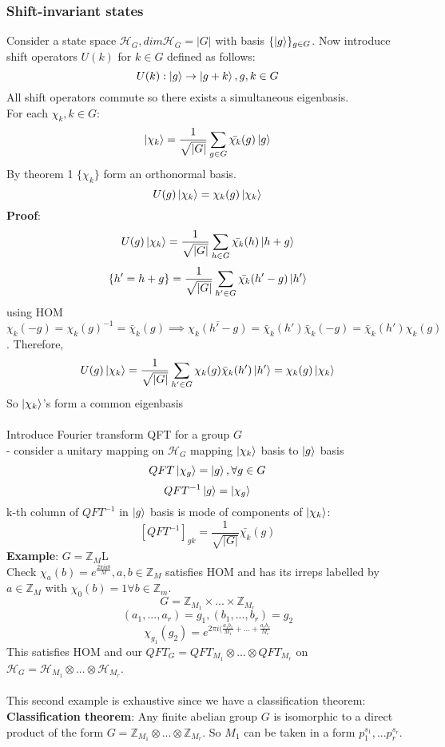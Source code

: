\documentclass{article}
\begin{document}
\subsubsection{Shift-invariant states}
Consider a state space $\mathcal{H}_G, dim \mathcal{H}_G = |G|$ with basis $\{ \ket{g}\}_{g \in G}$. Now introduce shift operators $U(k)$ for $k \in G$ defined as follows:
$$
U(k): \ket{g} \rightarrow \ket{g+k}, g, k \in G
$$
All shift operators commute so there exists a simultaneous eigenbasis.\\
For each $\chi_k, k \in G$:
$$
\ket{\chi_k} = \frac{1}{\sqrt{|G|}} \sum_{g \in G} \bar{\chi_k} (g) \ket{g}
$$
By theorem 1 $\{ \chi_k \}$ form an orthonormal basis.
$$
U(g) \ket{\chi_k} = \chi_k(g) \ket{\chi_k}
$$
\textbf{Proof}:$$U(g) \ket{\chi_k} = \frac{1}{\sqrt{|G|}} \sum_{h \in G} \bar{\chi_k} (h) \ket{h + g}$$
        $$
        \{h' = h+ g\} = \frac{1}{\sqrt{|G|}} \sum_{h' \in G} \bar{\chi_k} (h' - g) \ket{h'}
        $$
        using HOM $\chi_k(-g) = \chi_k(g)^{-1} = \bar \chi_k(g) \implies \overline{\chi_k(h'-g)} = \bar \chi_k(h') \bar \chi_k(-g) = \bar \chi_k(h') \chi_k(g)$. Therefore,
        $$
        U(g) \ket{\chi_k} = \frac{1}{\sqrt{|G|}}\sum_{h' \in G} \chi_k(g) \bar \chi_k(h') \ket{h'} = \chi_k(g) \ket{\chi_k}
        $$
        So $\ket{\chi_k}$'s form a common eigenbasis\\\\
        Introduce Fourier transform QFT for a group $G$\\
- consider a unitary mapping on $\mathcal{H}_G$ mapping $\ket{\chi_k}$ basis to $\ket{g}$ basis
$$
QFT \ket{\chi_g} = \ket{g}, \forall g \in G
$$
$$
QFT^{-1} \ket{g} =  \ket{\chi_g}
$$
k-th column of $QFT^{-1}$ in $\ket{g}$ basis is mode of components of $\ket{\chi_k}$:
        $$
        [QFT^{-1}]_{gk} = \frac{1}{\sqrt{|G|}} \bar{\chi_k}(g)
        $$
        \textbf{Example}: $G = \mathbb{Z}_M$L\\
        Check $\chi_a(b) = e^{\frac{2\pi i a b}{M}}, a, b \in \mathbb{Z}_M$ satisfies HOM and has its irreps labelled by $a \in \mathbb{Z}_M$ with $\chi_0(b) = 1 \forall b \in \mathbb{Z}_m$.
        $$
        G = \mathbb{Z}_{M_1} \times ... \times \mathbb{Z}_{M_r}
        $$
        $$
        (a_1, ..., a_r ) = g_1, (b_1, ..., b_r) = g_2
        $$
        $$
        \chi_{g_1} (g_2) = e^{2\pi i ( \frac{a_1 b_1}{M_1} +... + \frac{a_r b_r}{M_r}}
        $$
This satisfies HOM and our $QFT_G = QFT_{M_1} \otimes ... \otimes QFT_{M_r}$ on $\mathcal{H}_G = \mathcal{H}_{M_1} \otimes ... \otimes \mathcal{H}_{M_r}$.\\\\
This second example is exhaustive since we have a classification theorem:\\
\textbf{Classification theorem}: Any finite abelian group $G$ is isomorphic to a direct product of the form $G = \mathbb{Z}_{M_1} \otimes ... \otimes \mathbb{Z}_{M_r}$. So $M_1$ can be taken in a form $p_1^{s_1},... p_r^{s_r}$.
\end{document}
